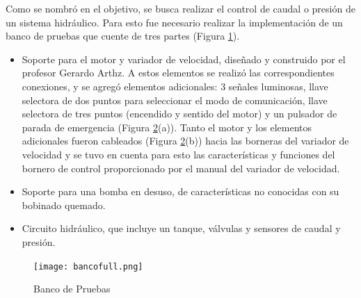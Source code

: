 Como se nombró en el objetivo, se busca realizar el control de caudal o presión de un sistema hidráulico. Para esto fue necesario realizar la implementación de un banco de pruebas que cuente de tres partes (Figura \ref{fig:bancofull}).
\begin{itemize}
	\item Soporte para el motor y variador de velocidad,  diseñado y construido por el profesor Gerardo Arthz. A estos elementos se realizó las correspondientes conexiones, y se agregó elementos adicionales: 3 señales luminosas, llave selectora de dos puntos para seleccionar el modo de comunicación, llave selectora de tres puntos (encendido y sentido del motor) y un pulsador de parada de emergencia (Figura \ref{fig:banco}(a)).
	Tanto el motor y los elementos adicionales fueron cableados (Figura \ref{fig:banco}(b)) hacia las borneras del variador de velocidad y se tuvo en cuenta para esto las características y funciones del bornero de control proporcionado por el manual del variador de velocidad\cite{InstaManual}. 
	
	\item Soporte para una bomba en desuso, de características no conocidas con su bobinado quemado.
	\item Circuito hidráulico, que incluye un tanque, válvulas y sensores de caudal y presión.
\end{itemize}




\begin{figure}[htb]
	\centering
	\texttt{[image: bancofull.png]}
	\label{fig:bancofull}
\end{figure}


\begin{figure}[H]
	\centering
	\caption{Banco de Pruebas} \label{fig:banco}
\end{figure}

